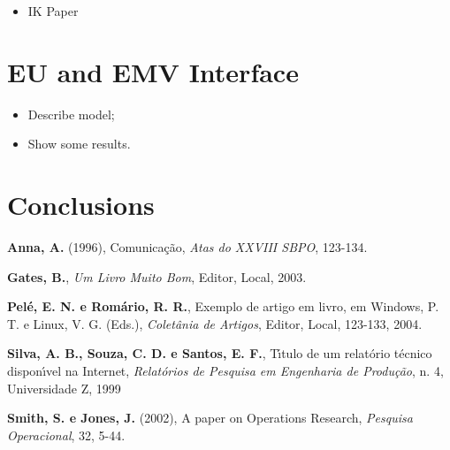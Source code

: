 \documentclass[a4paper,11pt]{article}
\begin{document}
\begin{itemize}
    \item IK Paper
\end{itemize}

\section{EU and EMV Interface}

\begin{itemize}
    \item Describe model;
    \item Show some results.
\end{itemize}

\section{Conclusions}

\bigskip
{}

\noindent \textbf {Anna, A.} (1996), Comunica\c c\~ao, \textit{Atas do XXVIII SBPO}, 123-134.

\noindent \textbf{Gates, B.}, \textit{Um Livro Muito Bom}, Editor, Local, 2003.

\noindent  \textbf{Pel\'e, E. N. e Rom\'ario, R. R.}, Exemplo de artigo em livro, em Windows, P. T. e Linux, V. G. (Eds.),
\textit{Colet\^ania de Artigos},  Editor, Local, 123-133, 2004.

\noindent  \textbf{Silva, A. B., Souza, C. D. e Santos, E. F.}, T\'\i tulo de um relat\'orio t\'ecnico dispon\'\i vel na Internet,
\textit{ Relat\'orios de Pesquisa em Engenharia de Produ\c c\~ao}, n. 4,  Universidade Z,
1999


\noindent  \textbf{Smith, S. e Jones, J.} (2002), A paper on Operations Research, \textit{Pesquisa Operacional},
32, 5-44.
\end{document}
